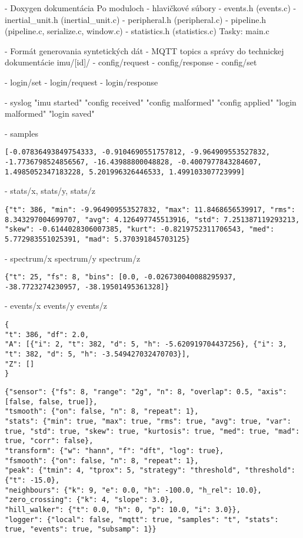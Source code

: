 - Doxygen dokumentácia
Po moduloch - hlavičkové súbory
- events.h  (events.c)
- inertial\_unit.h (inertial\_unit.c)
- peripheral.h  (peripheral.c)
- pipeline.h (pipeline.c, serialize.c, window.c)
- statistics.h (statistics.c)
Tasky: main.c

- Formát generovania syntetických dát
- MQTT topics a správy do technickej dokumentácie
imu/[id]/
- config/request
- config/response
- config/set

- login/set
- login/request
- login/response

- syslog
	"imu started"
	"config received"
	"config malformed"
	"config applied"
	"login malformed"
	"login saved"

- samples
\begin{verbatim}
[-0.07836493849754333, -0.9104690551757812, -9.964909553527832, -1.7736798524856567, -16.43988800048828, -0.4007977843284607, 1.4985052347183228, 5.201996326446533, 1.499103307723999]
\end{verbatim}

- stats/x, stats/y, stats/z
\begin{verbatim}
{"t": 386, "min": -9.964909553527832, "max": 11.8468656539917, "rms": 8.343297004699707, "avg": 4.126497745513916, "std": 7.251387119293213, "skew": -0.6144028306007385, "kurt": -0.8219752311706543, "med": 5.772983551025391, "mad": 5.370391845703125}
\end{verbatim}

- spectrum/x spectrum/y  spectrum/z
\begin{verbatim}
{"t": 25, "fs": 8, "bins": [0.0, -0.026730040088295937, -38.7723274230957, -38.19501495361328]}
\end{verbatim}

- events/x events/y events/z
\begin{verbatim}
{
"t": 386, "df": 2.0, 
"A": [{"i": 2, "t": 382, "d": 5, "h": -5.620919704437256}, {"i": 3, "t": 382, "d": 5, "h": -3.549427032470703}], 
"Z": []
}
\end{verbatim}

\begin{verbatim}
{"sensor": {"fs": 8, "range": "2g", "n": 8, "overlap": 0.5, "axis": [false, false, true]}, 
"tsmooth": {"on": false, "n": 8, "repeat": 1}, 
"stats": {"min": true, "max": true, "rms": true, "avg": true, "var": true, "std": true, "skew": true, "kurtosis": true, "med": true, "mad": true, "corr": false}, 
"transform": {"w": "hann", "f": "dft", "log": true},
"fsmooth": {"on": false, "n": 8, "repeat": 1},
"peak": {"tmin": 4, "tprox": 5, "strategy": "threshold", "threshold": {"t": -15.0},
"neighbours": {"k": 9, "e": 0.0, "h": -100.0, "h_rel": 10.0}, 
"zero_crossing": {"k": 4, "slope": 3.0}, 
"hill_walker": {"t": 0.0, "h": 0, "p": 10.0, "i": 3.0}}, 
"logger": {"local": false, "mqtt": true, "samples": "t", "stats": true, "events": true, "subsamp": 1}}
\end{verbatim}

